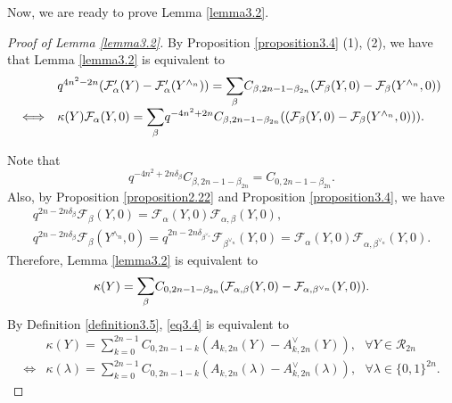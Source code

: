 \documentclass[11pt,oneside]{amsart}
\theoremstyle{plain}
\theoremstyle{definition}
\theoremstyle{remark}
\newcommand{\tx}[1]{\text{#1}}
\newcommand{\CF}{{\mathcal F}}
\newcommand{\CR}{{\mathcal R}}
\numberwithin{equation}{section}
\begin{document}
	
	Now, we are ready to prove Lemma \ref{lemma3.2}.
	\begin{proof}[Proof of Lemma \ref{lemma3.2}]
		By Proposition \ref{proposition3.4} (1), (2), we have that Lemma \ref{lemma3.2} is equivalent to
		\begin{equation*}
			\begin{array}{ll}
				&q^{4n^2-2n}(\CF_{\alpha}'(Y)-\CF_{\alpha}'(Y^{\wedge_n}))=\mathlarger{\sum}_{\beta}C_{\beta,2n-1-\beta_{2n}}(\CF_{\beta}(Y,0)-\CF_{\beta}(Y^{\wedge_n},0))\\
				\Longleftrightarrow & \kappa(Y)\CF_{\alpha}(Y,0)=\mathlarger{\sum}_{\beta}q^{-4n^2+2n}C_{\beta,2n-1-\beta_{2n}}((\CF_{\beta}(Y,0)-\CF_{\beta}(Y^{\wedge_n},0))).
			\end{array}
		\end{equation*}
		
		Note that
		\begin{equation*}
			q^{-4n^2+2n\delta_{\beta}}C_{\beta,2n-1-\beta_{2n}}=C_{0,2n-1-\beta_{2n}}.
		\end{equation*}
		Also, by Proposition \ref{proposition2.22} and Proposition \ref{proposition3.4}, we have
		\begin{equation*}
			\begin{array}{l}
				q^{2n-2n\delta_{\beta}}\CF_{\beta}(Y,0)=\CF_{\alpha}(Y,0)\CF_{\alpha,\beta}(Y,0),\\
				q^{2n-2n\delta_{\beta}}\CF_{\beta}(Y^{\wedge_n},0)=q^{2n-2n\delta_{\beta^{\vee_n}}}\CF_{\beta^{\vee_n}}(Y,0)=\CF_{\alpha}(Y,0)\CF_{\alpha,\beta^{\vee_n}}(Y,0).
			\end{array}
		\end{equation*}
		Therefore, Lemma \ref{lemma3.2} is equivalent to
		\begin{equation}\label{eq3.4}
			\kappa(Y)=\mathlarger{\sum}_{\beta}C_{0,2n-1-\beta_{2n}}(\CF_{\alpha,\beta}(Y,0)-\CF_{\alpha,\beta^{\vee_n}}(Y,0)).
		\end{equation}
		By Definition \ref{definition3.5}, \eqref{eq3.4} is equivalent to
		\begin{equation}\label{eq3.5}
			\begin{array}{ll}
				&\kappa(Y)=\sum_{k=0}^{2n-1} C_{0,2n-1-k}(A_{k,2n}(Y)-A_{k,2n}^{\vee}(Y)), \tx{ }\forall Y \in \CR_{2n}\\
				\Longleftrightarrow & \kappa(\lambda)=\sum_{k=0}^{2n-1} C_{0,2n-1-k}(A_{k,2n}(\lambda)-A_{k,2n}^{\vee}(\lambda)), \tx{ } \forall \lambda \in \lbrace 0,1 \rbrace^{2n}.
			\end{array}
		\end{equation}
		

\end{proof}
\end{document}
